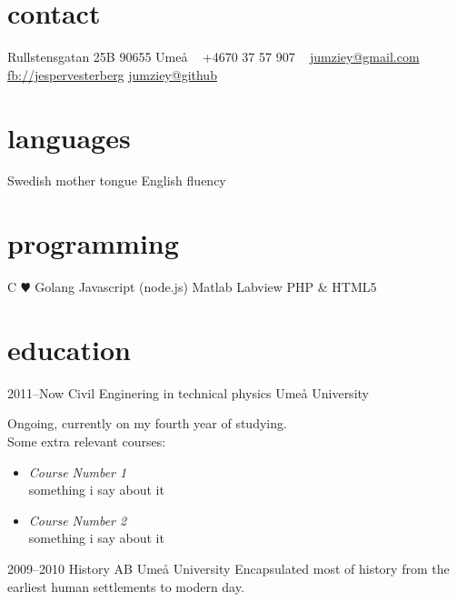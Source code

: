 \documentclass[]{friggeri-cv} %
\begin{document}


\begin{aside} %
\section{contact}
Rullstensgatan 25B
90655 Umeå
~
+4670 37 57 907
~
\href{mailto:jumziey@gmail.com}{jumziey@gmail.com}
\href{https://www.facebook.com/jesper.vesterberlg}{fb://jespervesterberg}
\href{https://github.com/Jumziey}{jumziey@github}
\section{languages}
Swedish mother tongue
English fluency
\section{programming}
C{\color{red} $\varheartsuit$}
Golang
Javascript (node.js)
Matlab
Labview
PHP \& HTML5
\end{aside}


\section{education}

\begin{entrylist}
\entry
{2011--Now}
{Civil Enginering {\normalfont in technical physics}}
{Umeå University}
{Ongoing, currently on my fourth year of studying.\\
Some extra relevant courses: 
\begin{itemize}
\item \emph{Course Number 1} \\
	something i say about it 
\item \emph{Course Number 2} \\
	something i say about it 
\end{itemize}
}
\entry
{2009--2010}
{History {\normalfont AB}}
{Umeå University}
{Encapsulated most of history from the earliest human settlements to modern day.}
\end{entrylist}
\end{document}
